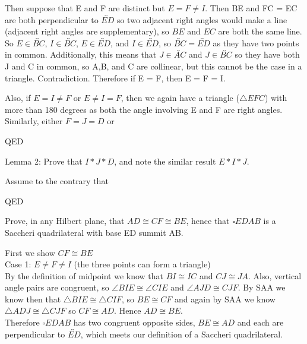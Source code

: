 \documentclass[12pt,letterpaper]{article}
\newcommand{\Proof}{\noindent {\bf Proof: }}
\newcommand{\QED}{\begin{flushright}QED\end{flushright}}
\begin{document}
Then suppose that E and F are distinct but $E = F \neq I$.  Then BE and FC = EC are both perpendicular to $\overleftrightarrow{ED}$ so two adjacent right angles would make a line (adjacent right angles are supplementary), so $BE$ and $EC$ are both the same line.  So $E \in \overleftrightarrow{BC}$, $I \in \overleftrightarrow{BC}$, $E \in \overleftrightarrow{ED}$, and $I \in \overleftrightarrow{ED}$, so $\overleftrightarrow{BC} = \overleftrightarrow{ED}$ as they have two points in common.  Additionally, this means that $J\in \overleftrightarrow{AC}$ and $J\in \overleftrightarrow{BC}$ so they have both J and C in common, so A,B, and C are collinear, but this cannot be the case in a triangle.  Contradiction.  Therefore if E = F, then E = F = I. 

Also, if $E = I \neq F$ or $E \neq I = F$, then we again have a triangle ($\triangle EFC$) with more than 180 degrees as both the angle involving E and F are right angles. Similarly, either $F=J=D$ or 


\QED	


\newpage 

Lemma 2: Prove that $I*J*D$, and note the similar result $E*I*J$. 

\Proof

Assume to the contrary that 


\QED


\newpage 

Prove, in any Hilbert plane, that $AD \cong CF \cong BE$, hence that $\square EDAB$ is a Saccheri quadrilateral with base ED summit AB.  \\


\Proof

First we show $CF \cong BE$\\

\noindent Case 1: $E \neq F \neq I$ (the three points can form a triangle)\\

By the definition of midpoint we know that $BI \cong IC$ and $CJ \cong JA$.  Also, vertical angle pairs are congruent, so $\angle BIE \cong \angle CIE$ and $\angle AJD \cong CJF$.  By SAA we know then that $\triangle BIE \cong \triangle CIF$, so $BE \cong CF$ and again by SAA we know $\triangle ADJ \cong \triangle CJF$ so $CF \cong AD$.  Hence $AD \cong BE$. \\

Therefore $\square EDAB$ has two congruent opposite sides, $BE \cong AD$ and each are perpendicular to $\overleftrightarrow{ED}$, which meets our definition of a Saccheri quadrilateral. \\
\end{document}
